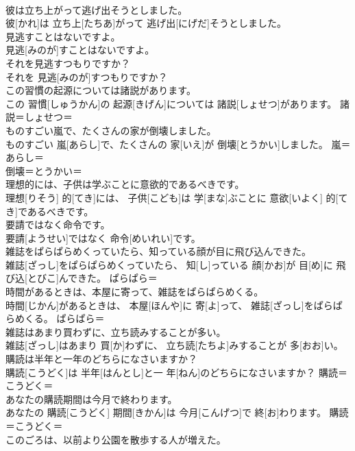 \documentclass[8pt]{extreport}
\begin{document}
\begin{CJK}{UTF8}{min}
\\	彼は立ち上がって逃げ出そうとしました。	
\\	彼[かれ]は 立ち上[たちあ]がって 逃げ出[にげだ]そうとしました。	
\\	見逃すことはないですよ。	
\\	見逃[みのが]すことはないですよ。	
\\	それを見逃すつもりですか？	
\\	それを 見逃[みのが]すつもりですか？	
\\	この習慣の起源については諸説があります。	
\\	この 習慣[しゅうかん]の 起源[きげん]については 諸説[しょせつ]があります。	諸説＝しょせつ＝ 
\\	ものすごい嵐で、たくさんの家が倒壊しました。	
\\	ものすごい 嵐[あらし]で、たくさんの 家[いえ]が 倒壊[とうかい]しました。	嵐＝あらし＝ 
\\	倒壊＝とうかい＝ 
\\	理想的には、子供は学ぶことに意欲的であるべきです。	
\\	理想[りそう] 的[てき]には、 子供[こども]は 学[まな]ぶことに 意欲[いよく] 的[てき]であるべきです。	
\\	要請ではなく命令です。	
\\	要請[ようせい]ではなく 命令[めいれい]です。	
\\	雑誌をぱらぱらめくっていたら、知っている顔が目に飛び込んできた。	
\\	雑誌[ざっし]をぱらぱらめくっていたら、 知[し]っている 顔[かお]が 目[め]に 飛び込[とびこ]んできた。	ぱらぱら＝ 
\\	時間があるときは、本屋に寄って、雑誌をぱらぱらめくる。	
\\	時間[じかん]があるときは、 本屋[ほんや]に 寄[よ]って、 雑誌[ざっし]をぱらぱらめくる。	ぱらぱら＝ 
\\	雑誌はあまり買わずに、立ち読みすることが多い。	
\\	雑誌[ざっし]はあまり 買[か]わずに、 立ち読[たちよ]みすることが 多[おお]い。	
\\	購読は半年と一年のどちらになさいますか？	
\\	購読[こうどく]は 半年[はんとし]と一 年[ねん]のどちらになさいますか？	購読＝こうどく＝ 
\\	あなたの購読期間は今月で終わります。	
\\	あなたの 購読[こうどく] 期間[きかん]は 今月[こんげつ]で 終[お]わります。	購読＝こうどく＝ 
\\	このごろは、以前より公園を散歩する人が増えた。	

\end{CJK}
\end{document}
